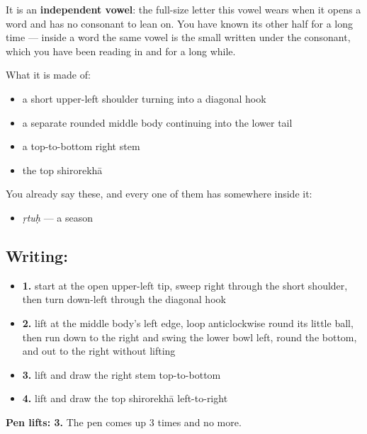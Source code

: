 It is an \textbf{independent vowel}: the full-size letter this vowel wears when it opens a word and has no consonant to lean on. You have known its other half for a long time — inside a word the same vowel is the small \textbf{} written under the consonant, which you have been reading in \textbf{} and \textbf{} for a long while.

What it is made of:

\begin{itemize}
\raggedright
  \item a short upper-left shoulder turning into a diagonal hook
  \item a separate rounded middle body continuing into the lower tail
  \item a top-to-bottom right stem
  \item the top shirorekhā
\end{itemize}

You already say these, and every one of them has  somewhere inside it:

\begin{itemize}
\raggedright
  \item \textbf{} \emph{ṛtuḥ} — a season
\end{itemize}

\subsection*{Writing: }

\begin{itemize}
\raggedright
  \item \textbf{1.} start at the open upper-left tip, sweep right through the short shoulder, then turn down-left through the diagonal hook
  \item \textbf{2.} lift at the middle body's left edge, loop anticlockwise round its little ball, then run down to the right and swing the lower bowl left, round the bottom, and out to the right without lifting
  \item \textbf{3.} lift and draw the right stem top-to-bottom
  \item \textbf{4.} lift and draw the top shirorekhā left-to-right
\end{itemize}

\textbf{Pen lifts: 3.} The pen comes up 3 times and no more.

